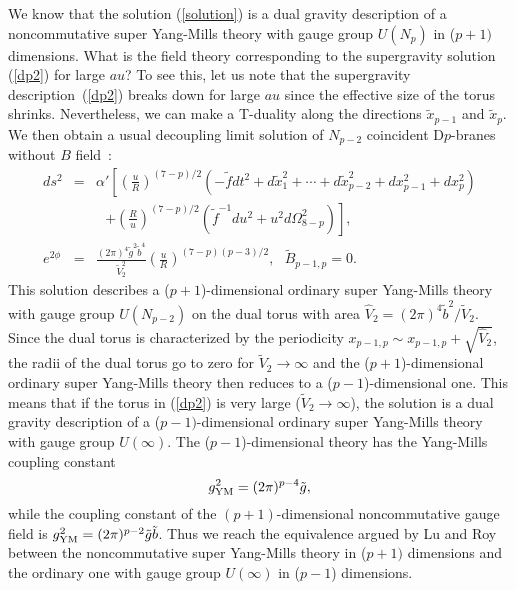 \documentclass[a4paper,12pt]{article}
\begin{document}
We know that the solution (\ref{solution}) is a dual gravity description of
a noncommutative super Yang-Mills theory with gauge group $U(N_p)$ in ($p+1)$
dimensions. What is the field theory corresponding to the supergravity
solution (\ref{dp2}) for large $au$? To see this, let us note that the
supergravity description~(\ref{dp2}) breaks down for large $au$ since the
effective size of the torus shrinks. Nevertheless, we can make a T-duality
along the directions $\tilde{x}_{p-1}$ and $\tilde{x}_p$. We then obtain
a usual decoupling limit solution of $N_{p-2}$ coincident D$p$-branes
without $B$ field~\cite{Itzhaki}:
\begin{eqnarray}
ds^2 &=&\alpha' \left [\left (\frac{u}{R}\right)^{(7-p)/2}\left(-\tilde{f}dt^2
 +d\tilde{x}_1^2 +\cdots +d\tilde{x}_{p-2}^2 +dx_{p-1}^2 +dx_p^2\right)
    \right.  \nonumber \\
 && ~~~  \left. +\left(\frac{R}{u}\right)^{(7-p)/2}\left(\tilde{f}^{-1}du^2 +
   u^2d\Omega^2_{8-p}\right) \right], \nonumber \\
\label{dp}
 e^{2\phi} &=&  \frac{(2\pi)^4\tilde{g}^2 \tilde{b}^4}{\tilde{V}_2^2}
     \left(\frac{u}{R}\right)^{(7-p)(p-3)/2}, \ \ \ \tilde{B}_{p-1,p}=0.
\end{eqnarray}
This solution describes a ($p+1$)-dimensional ordinary super Yang-Mills theory
with gauge group $U(N_{p-2})$ on the dual torus with area $\hat{V}_2=
(2\pi)^4\tilde{b}^2/\tilde{V}_2$. Since the dual torus is characterized by
the periodicity $x_{p-1,p} \sim x_{p-1,p} + \sqrt{\hat{V}_2}$, the
radii of the dual torus go to zero for $\tilde{V}_2 \to \infty$ and the
($p+1$)-dimensional ordinary super Yang-Mills theory then reduces to a
($p-1$)-dimensional one. This means that if the torus in (\ref{dp2}) is
very large ($\tilde{V}_2 \to \infty$), the solution is a dual
gravity description of a ($p-1)$-dimensional ordinary super Yang-Mills
theory with gauge group $U(\infty)$. The ($p-1$)-dimensional theory has the
Yang-Mills coupling constant
\begin{equation}
\label{const1}
g^2_{\rm YM}=(2\pi)^{p-4}\tilde{g},
\end{equation}
while the coupling constant of the $(p+1)$-dimensional noncommutative gauge
field is $g^2_{\rm YM}=(2\pi)^{p-2}\tilde{g}\tilde{b}$. Thus we reach the
equivalence argued by Lu and Roy \cite{Lu} between the noncommutative
super Yang-Mills theory in ($p+1)$ dimensions and the ordinary one
with gauge group $U(\infty)$ in ($p-1$) dimensions.
\end{document}
